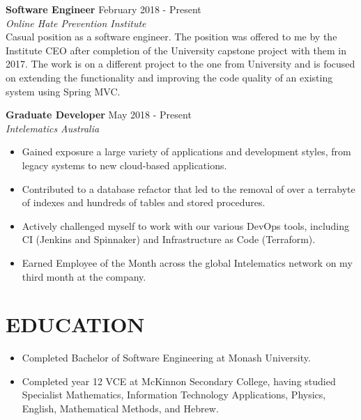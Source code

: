 \documentclass[margin, 10pt]{res} %
\begin{document}
\begin{resume}
\textbf{Software Engineer} \hfill February 2018 - Present \\
{\sl Online Hate Prevention Institute} \\
Casual position as a software engineer. The position was offered to me by the Institute CEO after completion of the University capstone project with them in 2017. The work is on a different project to the one from University and is focused on extending the functionality and improving the code quality of an existing system using Spring MVC.

\textbf{Graduate Developer} \hfill May 2018 - Present \\
{\sl Intelematics Australia} \\
\begin{itemize}

\item Gained exposure a large variety of applications and development styles, from legacy systems to new cloud-based applications.
\item Contributed to a database refactor that led to the removal of over a terrabyte of indexes and hundreds of tables and stored procedures.
\item Actively challenged myself to work with our various DevOps tools, including CI (Jenkins and Spinnaker) and Infrastructure as Code (Terraform). %
\item Earned Employee of the Month across the global Intelematics network on my third month at the company.

\end{itemize} 


\section{EDUCATION}

\begin{itemize}

\item Completed Bachelor of Software Engineering at Monash University. %
\item Completed year 12 VCE at McKinnon Secondary College, having studied Specialist  Mathematics, Information Technology Applications, Physics, English, Mathematical Methods, and Hebrew.


\end{itemize}
\end{resume}
\end{document}
